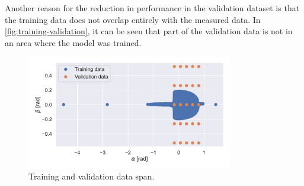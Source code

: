 Another reason for the reduction in performance in the validation dataset is that the training data does not overlap entirely with the measured data. In \autoref{fig:training-validation}, it can be seen that part of the validation data is not in an area where the model was trained. 

\begin{figure}[h]
\centering
  \includegraphics[width=0.8\textwidth]{figures/parameter_estimation_domain}
  \caption{Training and validation data span.}
  \label{fig:training-validation}
\end{figure}


